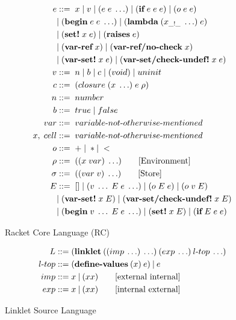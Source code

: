 \documentclass[sigplan,screen,anonymous]{acmart}
\def\dash {\text{-}}
\begin{document}
\begin{figure}[tbp]
  \begin{align*}
    e &::=\; x\; |\; v\; |\; (e\; e\; \ldots)\; |\; (\textbf{if}\; e\; e\; e)\; |\; (o\; e\; e)\; \\
    \; &|\; (\textbf{begin}\; e\; e\; \ldots)\; |\; (\textbf{lambda}\; (x_{\_!\_}\; \ldots)\; e)\\
    \; &|\; (\textbf{set!}\; x\; e)\; |\; (\textbf{raises}\; e)\\
    \; &|\; (\textbf{var\dash ref}\; x)\; |\; (\textbf{var\dash ref/no\dash check}\; x) \\
    \; &|\; (\textbf{var\dash set!}\; x\; e)\; |\; (\textbf{var\dash set/check\dash undef!}\; x\; e) \\
    v   &::=\; n\; |\; b\; |\; c\; |\; (void)\;|\; uninit \\ %
    c   &::=\; (closure\; (x\; \ldots)\; e\; \rho) \\
    n   &::=\; number \\
    b   &::=\; true\; |\; false \\
    var &::=\; variable\dash not\dash otherwise\dash mentioned \\ %
    x,\; cell &::=\; variable\dash not\dash otherwise\dash mentioned \\ %
    o  &::=\; +\; |\; * |\; < \\
    \rho   &::=\; ((x\; var)\; \ldots) \tag*{[Environment]}\\
    \sigma   &::=\; ((var\; v)\; \ldots) \tag*{[Store]}\\
    E   &::=\; []\; |\; (v\; \ldots\; E\; e\; \ldots)\; |\; (o\; E\; e)\; |\; (o\; v\; E) \\
    \;  &|\; (\textbf{var\dash set!}\; x\; E)\; |\; (\textbf{var\dash set/check\dash undef!}\; x\; E) \\
    \;  &|\; (\textbf{begin}\; v\; \ldots\; E\; e\; \ldots)\; |\; (\textbf{set!}\; x\; E)\; |\; (\textbf{if}\; E\; e\; e)
  \end{align*}
  \caption{Racket Core Language (RC)}
  \label{fig:racket-source}
\end{figure}

\begin{figure}[tbp]
  \begin{align*}
    L  &::= (\textbf{linklet}\:((imp\: \ldots)\: \ldots)\:(exp\: \ldots)\:l\dash top\:\ldots)\\
    l\dash top &::= (\textbf{define\dash values}\:(x)\:e)\:|\:e \\
    imp &::= x\:|\:(x x) \tag*{[external internal]}\\
    exp &::= x\:|\:(x x) \tag*{[internal external]}
  \end{align*}
  \caption{Linklet Source Language}
  \label{fig:linklet-source}
\end{figure}
\end{document}
